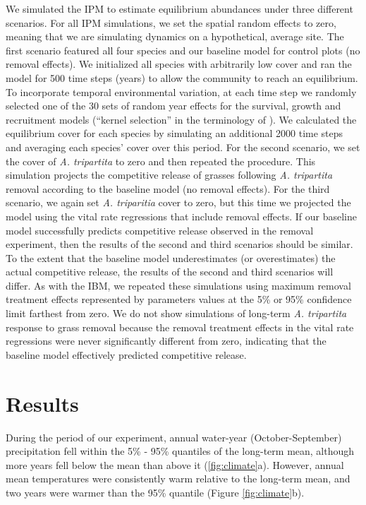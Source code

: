 \documentclass[11pt]{article}
\begin{document}
\begin{doublespacing}
We simulated the IPM to estimate equilibrium abundances under three different scenarios. For all IPM simulations, we set the spatial random effects to zero, meaning that we are simulating dynamics on a hypothetical, average site. The first scenario featured all four species and our baseline model for control plots (no removal effects). We initialized all species with arbitrarily low cover and ran the model for 500 time steps (years) to allow the community to reach an equilibrium. To incorporate temporal environmental variation, at each time step we randomly selected one of the 30 sets of random year effects for the survival, growth and recruitment models (``kernel selection'' in the terminology of \citealt{metcalf_statistical_2015}). We calculated the equilibrium cover for each species by simulating an additional 2000 time steps and averaging each species' cover over this period. For the second scenario, we set the cover of \textit{A. tripartita} to zero and then repeated the procedure. This simulation projects the competitive release of grasses following \textit{A. tripartita} removal according to the baseline model (no removal effects). For the third scenario, we again set \textit{A. triparitia} cover to zero, but this time we projected the model using the vital rate regressions that include removal effects. If our baseline model successfully predicts competitive release observed in the removal experiment, then the results of the second and third scenarios should be similar. To the extent that the baseline model underestimates (or overestimates) the actual competitive release, the results of the second and third scenarios will differ. As with the IBM, we repeated these simulations using maximum removal treatment effects represented by parameters values at the 5\% or 95\% confidence limit farthest from zero. We do not show simulations of long-term \textit{A. tripartita} response to grass removal because the removal treatment effects in the vital rate regressions were never significantly different from zero, indicating that the baseline model effectively predicted competitive release. 

\section*{Results}

During the period of our experiment, annual water-year (October-September) precipitation fell within the 5\% - 95\% quantiles of the 
long-term mean, although more years fell below the mean than above it (\ref{fig:climate}a). However, annual mean temperatures 
were consistently warm relative to the long-term mean, and two years were warmer than the 95\% quantile (Figure \ref{fig:climate}b).  


\end{doublespacing}
\end{document}
